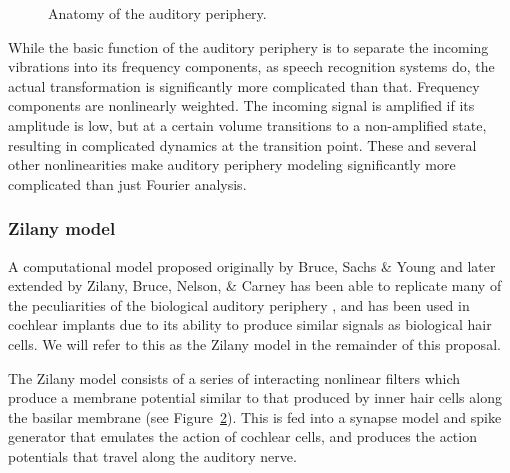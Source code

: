 \documentclass{article}
\begin{document}
\begin{figure}\begin{center}
  \label{fig:anatomy}
  \caption{Anatomy of the auditory periphery.}
\end{center}\end{figure}

While the basic function of the auditory periphery
is to separate the incoming vibrations
into its frequency components,
as speech recognition systems do,
the actual transformation is significantly
more complicated than that.
Frequency components are nonlinearly weighted.
The incoming signal is amplified
if its amplitude is low,
but at a certain volume transitions
to a non-amplified state,
resulting in complicated dynamics
at the transition point.
These and several other nonlinearities
make auditory periphery modeling
significantly more complicated
than just Fourier analysis.

\subsubsection{Zilany model}

A computational model proposed originally by
Bruce, Sachs \& Young
and later extended by Zilany, Bruce, Nelson, \& Carney
has been able to replicate
many of the peculiarities
of the biological auditory periphery
\citep{bruce2003,zilany2006,zilany2007,zilany2009,zilany2014},
and has been used in cochlear implants
due to its ability to produce
similar signals as biological hair cells.
We will refer to this as the
Zilany model in the remainder of this proposal.

The Zilany model consists of a series
of interacting nonlinear filters
which produce a membrane potential
similar to that produced
by inner hair cells along the basilar membrane
(see Figure~\ref{fig:zilany}).
This is fed into a synapse model and spike generator
that emulates the action of cochlear cells,
and produces the action potentials
that travel along the auditory nerve.

\begin{figure}\begin{center}
  \label{fig:zilany}
  \caption{}
\end{center}\end{figure}
\end{document}
